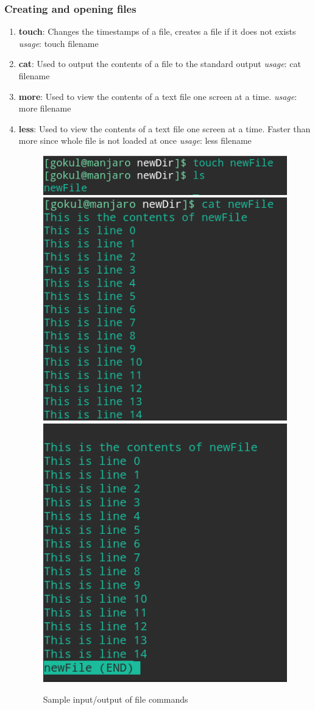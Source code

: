 \documentclass{article}
\begin{document}
\subsubsection{Creating and opening files}
\begin{enumerate}
    \item {\bf touch}: Changes the timestamps of a file, creates a file if it does not exists\newline
    \hspace{\parindent} {\em usage}: touch filename
    
    \item {\bf cat}: Used to output the contents of a file to the standard output\newline
    \hspace{\parindent} {\em usage}: cat filename
    
    \item {\bf more}: Used to view the contents of a text file one screen at a time.\newline
    \hspace{\parindent} {\em usage}: more filename
    
    \item {\bf less}: Used to view the contents of a text file one screen at a time. Faster than more since whole file is not loaded at once\newline
    \hspace{\parindent} {\em usage}: less filename
    \begin{figure}[h!]
        \centering
        \includegraphics[height=.18\textwidth, width=.83\textwidth]{img/p1/ss3.png}
        \includegraphics[height=.40\textwidth]{img/p1/ss06.png}
         \includegraphics[height=.40\textwidth]{img/p1/ss07.png}
        \caption{Sample input/output of file commands}
    \end{figure}
\end{enumerate}
\end{document}
